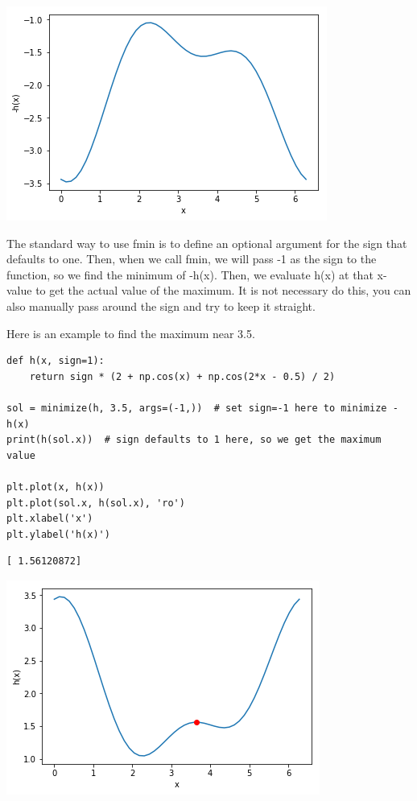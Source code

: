 \documentclass[11pt]{article}
\begin{document}
\begin{center}
\includegraphics[width=.9\linewidth]{obipy-resources/baab0982fed766ced9ac305dd57e067d-90490ula.png}
\end{center}

The standard way to use fmin is to define an optional argument for the sign that defaults to one. Then, when we call fmin, we will pass -1 as the sign to the function, so we find the minimum of -h(x). Then, we evaluate h(x) at that x-value to get the actual value of the maximum. It is not necessary do this, you can also manually pass around the sign and try to keep it straight.

Here is an example to find the maximum near 3.5.

\begin{verbatim}
def h(x, sign=1):
    return sign * (2 + np.cos(x) + np.cos(2*x - 0.5) / 2)

sol = minimize(h, 3.5, args=(-1,))  # set sign=-1 here to minimize -h(x)
print(h(sol.x))  # sign defaults to 1 here, so we get the maximum value

plt.plot(x, h(x))
plt.plot(sol.x, h(sol.x), 'ro')
plt.xlabel('x')
plt.ylabel('h(x)')
\end{verbatim}

\begin{verbatim}
[ 1.56120872]

\end{verbatim}




\begin{center}
\includegraphics[width=.9\linewidth]{obipy-resources/baab0982fed766ced9ac305dd57e067d-904907vg.png}
\end{center}
\end{document}
